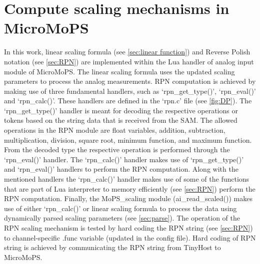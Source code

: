 \section{Compute scaling mechanisms in MicroMoPS}\label{sec:scaling}
	 In this work, linear scaling formula (see \cref{sec:linear function}) and Reverse Polish notation (see \cref{sec:RPN}) are implemented within the Lua handler of analog input module of MicroMoPS. 
	 The linear scaling formula uses the updated scaling parameters to process the analog measurements. 
	 RPN computation is achieved by making use of three fundamental handlers, such as `rpn\_get\_type()',
	 `rpn\_eval()' and `rpn\_calc()'. These handlers are defined in the `rpn.c' file (see \cref{fig:DP}). 
	 The `rpn\_get\_type()' handler is meant for decoding the respective operations or tokens based on the string data that is received from the SAM. The allowed operations in the RPN module are float variables, addition, subtraction, multiplication, division, square root, minimum function, and maximum function.
	 From the decoded type the respective operation is performed through the `rpn\_eval()' handler. The `rpn\_calc()' handler makes use of `rpn\_get\_type()' and `rpn\_eval()' handlers to perform the RPN computation. Along with the mentioned handlers the `rpn\_calc()' handler makes use of some of the functions that are part of Lua interpreter to memory efficiently (see \cref{sec:RPN}) perform the RPN computation. Finally, the MoPS\_scaling module (ai\_read\_scaled()) makes use of either `rpn\_calc()' or linear scaling formula to process the data using dynamically parsed scaling parameters (see \cref{sec:parse}).  
The operation of the RPN scaling mechanism is tested by hard coding the RPN string (see \cref{sec:RPN}) to channel-specific .func variable (updated in the config file).
Hard coding of RPN string is achieved by communicating the RPN string from TinyHost to MicroMoPS.